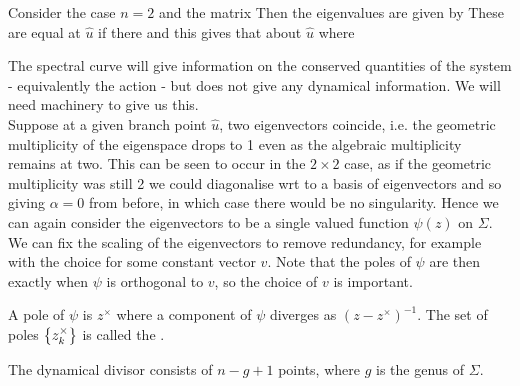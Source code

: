 \documentclass{article}
\begin{document}
\begin{example}
Consider the case $n=2$ and the matrix 
Then the eigenvalues are given by 
These are equal at $\hat{u}$ if there 
and this gives that about $\hat{u}$
where 
\end{example}
The spectral curve will give information on the conserved quantities of the system - equivalently the action - but does not give any dynamical information. We will need machinery to give us this. \\
Suppose at a given branch point $\hat{u}$, two eigenvectors coincide, i.e. the geometric multiplicity of the eigenspace drops to 1 even as the algebraic multiplicity remains at two. This can be seen to occur in the $2 \times 2$ case, as if the geometric multiplicity was still 2 we could diagonalise wrt to a basis of eigenvectors and so 
giving $\alpha = 0$ from before, in which case there would be no singularity. Hence we can again consider the eigenvectors to be a single valued function $\psi(z)$ on $\Sigma$. We can fix the scaling of the eigenvectors to remove redundancy, for example with the choice 
for some constant vector $v$. Note that the poles of $\psi$ are then exactly when $\psi$ is orthogonal to $v$, so the choice of $v$ is important.  

\begin{definition}
A pole of $\psi$ is $z^\times$ where a component of $\psi$ diverges as $(z-z^\times)^{-1}$. The set of poles $\left\{ z_k^\times \right\}$ is called the . 
\end{definition}

\begin{prop}
The dynamical divisor consists of $n-g+1$ points, where $g$ is the genus of $\Sigma$. 
\end{prop}

\end{document}
